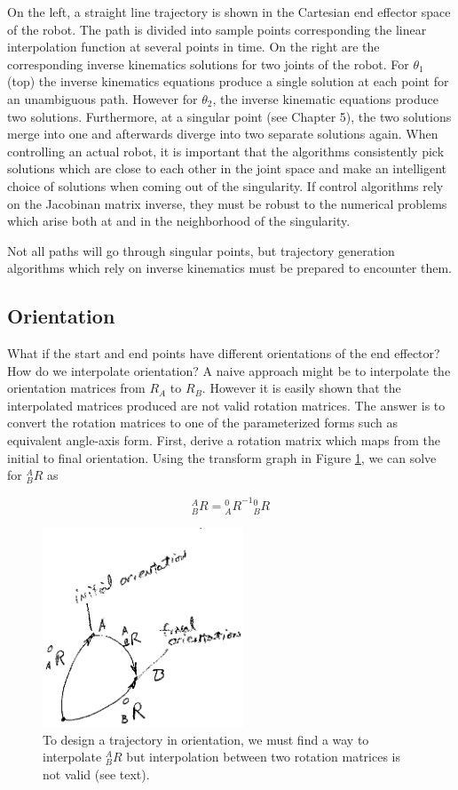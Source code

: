 On the left, a straight line trajectory is shown in the Cartesian end effector space of the robot.   The path is divided into sample points corresponding the linear interpolation function at several points in time.  On the right are the corresponding inverse kinematics solutions for two joints of the robot.   For $\theta_1$ (top) the inverse kinematics equations produce a single solution at each point for an unambiguous path.  However for $\theta_2$, the inverse kinematic equations produce two solutions.  Furthermore, at a singular point (see Chapter 5), the two solutions merge into one and afterwards diverge into two separate solutions again.  When controlling an actual robot, it is important that the algorithms consistently pick solutions which are close to each other in the joint space and make an intelligent choice of solutions when coming out of the singularity.  If control algorithms rely on the Jacobinan matrix inverse, they must be robust to the numerical problems which arise both at and in the
neighborhood of the singularity.

Not all paths will go through singular points, but trajectory generation algorithms which rely on inverse kinematics must be prepared to encounter them.

\subsection{Orientation}
What if the start and end points have different orientations of the end effector?  How do we interpolate orientation?   A naive approach might be to interpolate the orientation matrices from $R_A$ to $R_B$.   However it is easily shown that the interpolated matrices produced are not valid rotation matrices.  The answer is to convert the rotation matrices to one of the parameterized forms such as equivalent angle-axis form.   First, derive a rotation matrix which maps from the initial to final orientation.   Using the transform graph in Figure \ref{orientationtrajectory}, we can solve for $^A_BR$ as

\[
^A_BR = {^0_AR}^{-1}{^0_BR}
\]

\begin{figure}\centering
\includegraphics[width=6cm]{figs07/00519.eps}
\caption{To design a trajectory in orientation, we must find a way to interpolate ${^A_BR}$ but interpolation between two rotation matrices is not valid (see text).}\label{orientationtrajectory}
\end{figure}



